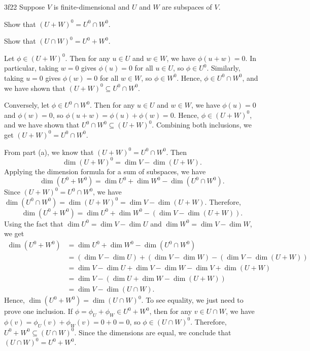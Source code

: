 \begin{exercise}{3f22}
    Suppose $V$ is finite-dimensional and $U$ and $W$ are subspaces of $V$.
    \begin{subexercises}
        \item Show that $(U + W)^0 = U^0 \cap W^0$.
        \item Show that $(U \cap W)^0 = U^0 + W^0$.
    \end{subexercises}
\end{exercise}

\begin{solenum}
    \item Let $\phi \in (U + W)^0$.
	Then for any $u \in U$ and $w \in W$, we have $\phi(u + w) = 0$.
	In particular, taking $w = 0$ gives $\phi(u) = 0$ for all $u \in U$, so $\phi \in U^0$.
	Similarly, taking $u = 0$ gives $\phi(w) = 0$ for all $w \in W$, so $\phi \in W^0$.
	Hence, $\phi \in U^0 \cap W^0$, and we have shown that $(U + W)^0 \subseteq U^0 \cap W^0$.
    
    Conversely, let $\phi \in U^0 \cap W^0$.
	Then for any $u \in U$ and $w \in W$, we have $\phi(u) = 0$ and $\phi(w) = 0$, so $\phi(u + w) = \phi(u) + \phi(w) = 0$.
	Hence, $\phi \in (U + W)^0$, and we have shown that $U^0 \cap W^0 \subseteq (U + W)^0$.
	Combining both inclusions, we get $(U + W)^0 = U^0 \cap W^0$.
    \item From part (a), we know that $(U + W)^0 = U^0 \cap W^0$.
	Then
    \[
    	\dim(U + W)^0 = \dim V - \dim(U + W).
    \]
    Applying the dimension formula for a sum of subspaces, we have
    \[
    	\dim(U^0 + W^0) = \dim U^0 + \dim W^0 - \dim(U^0 \cap W^0).
    \]
    Since $(U + W)^0 = U^0 \cap W^0$, we have $\dim(U^0 \cap W^0) = \dim(U + W)^0 = \dim V - \dim(U + W)$.
	Therefore,
    \[
    	\dim(U^0 + W^0) = \dim U^0 + \dim W^0 - (\dim V - \dim(U + W)).
    \]
    Using the fact that $\dim U^0 = \dim V - \dim U$ and $\dim W^0 = \dim V - \dim W$, we get
    \begin{align*}
        \dim(U^0 + W^0) &= \dim U^0 + \dim W^0 - \dim(U^0 \cap W^0) \\
        &= (\dim V - \dim U) + (\dim V - \dim W) - (\dim V - \dim(U + W)) \\
        &= \dim V - \dim U + \dim V - \dim W - \dim V + \dim(U + W) \\
        &= \dim V - (\dim U + \dim W - \dim(U + W)) \\
        &= \dim V - \dim(U \cap W).
    \end{align*}
    Hence, $\dim(U^0 + W^0) = \dim(U \cap W)^0$.
	To see equality, we just need to prove one inclusion.
	If $\phi = \phi_U + \phi_W \in U^0 + W^0$, then for any $v \in U \cap W$, we have $\phi(v) = \phi_U(v) + \phi_W(v) = 0 + 0 = 0$, so $\phi \in (U \cap W)^0$.
	Therefore, $U^0 + W^0 \subseteq (U \cap W)^0$.
	Since the dimensions are equal, we conclude that $(U \cap W)^0 = U^0 + W^0$.
\end{solenum}

